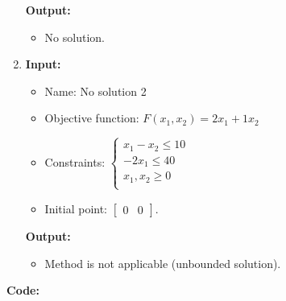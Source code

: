 \documentclass{article}
\begin{document}
\begin{enumerate}[label={(\arabic*)}, itemsep=0.25in]
          \textbf{Output:}
          \begin{itemize}
              \item No solution.
          \end{itemize}

    \item \textbf{Input:}
          \begin{itemize}
              \item Name: No solution 2
              \item Objective function: \(F(x_1, x_2) = 2 x_1 + 1 x_2\)
              \item Constraints: \(\begin{cases}
                        x_1 - x_2 \le 10 \\
                        -2 x_1 \le 40    \\
                        x_1, x_2 \ge 0   \\
                    \end{cases}\)
              \item Initial point: \(\begin{bmatrix} 0 & 0 \end{bmatrix}\).
          \end{itemize}

          \textbf{Output:}
          \begin{itemize}
              \item Method is not applicable (unbounded solution).
          \end{itemize}
\end{enumerate}

\newpage

\textbf{Code:}


\newpage


\newpage


\newpage

\end{document}
